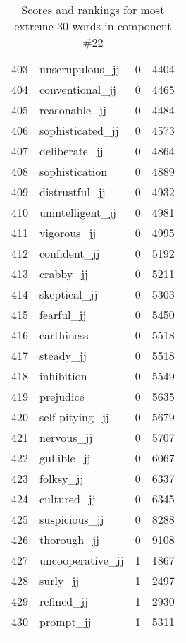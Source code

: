 \begin{longtable}[!htbp]{| rlr@{.}l |}
    403 & unscrupulous\_jj & 0 & 4404 \\
    404 & conventional\_jj & 0 & 4465 \\
    405 & reasonable\_jj & 0 & 4484 \\
    406 & sophisticated\_jj & 0 & 4573 \\
    407 & deliberate\_jj & 0 & 4864 \\
    408 & sophistication & 0 & 4889 \\
    409 & distrustful\_jj & 0 & 4932 \\
    410 & unintelligent\_jj & 0 & 4981 \\
    411 & vigorous\_jj & 0 & 4995 \\
    412 & confident\_jj & 0 & 5192 \\
    413 & crabby\_jj & 0 & 5211 \\
    414 & skeptical\_jj & 0 & 5303 \\
    415 & fearful\_jj & 0 & 5450 \\
    416 & earthiness & 0 & 5518 \\
    417 & steady\_jj & 0 & 5518 \\
    418 & inhibition & 0 & 5549 \\
    419 & prejudice & 0 & 5635 \\
    420 & self-pitying\_jj & 0 & 5679 \\
    421 & nervous\_jj & 0 & 5707 \\
    422 & gullible\_jj & 0 & 6067 \\
    423 & folksy\_jj & 0 & 6337 \\
    424 & cultured\_jj & 0 & 6345 \\
    425 & suspicious\_jj & 0 & 8288 \\
    426 & thorough\_jj & 0 & 9108 \\
    427 & uncooperative\_jj & 1 & 1867 \\
    428 & surly\_jj & 1 & 2497 \\
    429 & refined\_jj & 1 & 2930 \\
    430 & prompt\_jj & 1 & 5311 \\
    \hline
    \caption{Scores and rankings for most extreme 30 words in component \#22} \\
\end{longtable}
